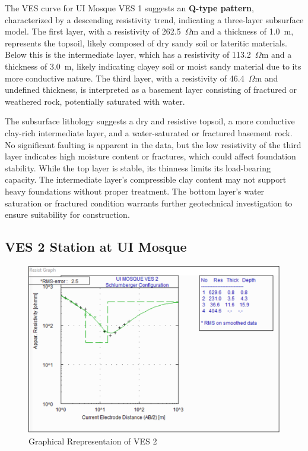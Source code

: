 \documentclass[12pt,a4paper]{report}
\begin{document}
The VES curve for UI Mosque VES 1 suggests an \textbf{Q-type pattern}, characterized by a descending resistivity trend, indicating a three-layer subsurface model. The first layer, with a resistivity of 262.5~$\Omega$m and a thickness of 1.0~m, represents the topsoil, likely composed of dry sandy soil or lateritic materials. Below this is the intermediate layer, which has a resistivity of 113.2~$\Omega$m and a thickness of 3.0~m, likely indicating clayey soil or moist sandy material due to its more conductive nature. The third layer, with a resistivity of 46.4~$\Omega$m and undefined thickness, is interpreted as a basement layer consisting of fractured or weathered rock, potentially saturated with water.

The subsurface lithology suggests a dry and resistive topsoil, a more conductive clay-rich intermediate layer, and a water-saturated or fractured basement rock. No significant faulting is apparent in the data, but the low resistivity of the third layer indicates high moisture content or fractures, which could affect foundation stability. While the top layer is stable, its thinness limits its load-bearing capacity. The intermediate layer’s compressible clay content may not support heavy foundations without proper treatment. The bottom layer’s water saturation or fractured condition warrants further geotechnical investigation to ensure suitability for construction.

\subsection{VES 2 Station at UI Mosque}

\begin{figure}[H]
    \centering
    \includegraphics[width=1.0\textwidth]{ui_ves2.png}
    \caption{Graphical Rrepresentaion of VES 2}
    \label{fig:VES_2_Curve}
\end{figure}
\end{document}

